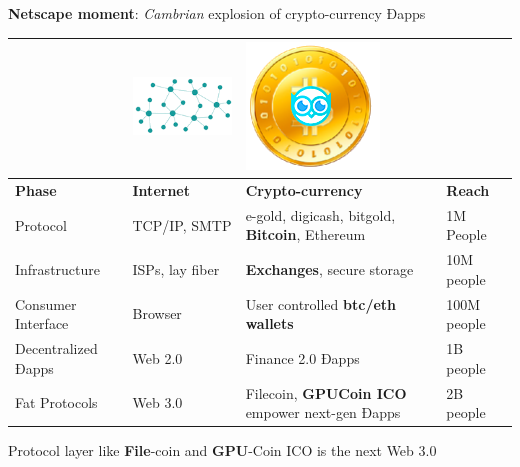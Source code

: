 \textbf{Netscape moment}: \emph{Cambrian} explosion of crypto-currency Ðapps
 

 \begin{adjustbox}{width=.75\textwidth}
\begin{tabularx} {\textwidth}{|X|X|X|X|}
 \hline
& \includegraphics[scale=0.2]{static/decentnew} & \includegraphics[scale=0.2]{static/hootcoin} & \\
 \hline
\textbf{Phase} & \textbf{Internet} & \textbf{Crypto-currency} & \textbf{Reach}\\
\hline
Protocol & TCP/IP, SMTP & e-gold, digicash, bitgold, \textbf{Bitcoin}, Ethereum & 1M People \\
\hline
Infrastructure & ISPs, lay fiber & \textbf{Exchanges}, secure storage & 10M people \\
\hline
Consumer Interface & Browser & User controlled \textbf{btc/eth wallets} & 100M people \\
\hline
Decentralized Ðapps & Web 2.0 & Finance 2.0 Ðapps & 1B people\\
\hline
Fat Protocols & Web 3.0 & Filecoin, \textbf{GPUCoin ICO} empower next-gen Ðapps & 2B people\\

\hline
\end{tabularx}
\end{adjustbox}

Protocol layer like \textbf{File}-coin and \textbf{GPU}-Coin ICO is the next Web 3.0